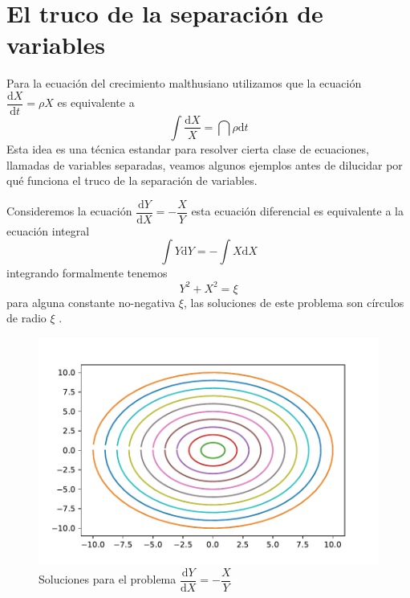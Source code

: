 \section{El truco de la separación de variables}

Para la ecuación del crecimiento malthusiano utilizamos que la ecuación $\dfrac{\mathrm{d}X}{\mathrm{d}t}=\rho X$ es equivalente a 
$$\int \dfrac{\mathrm{d}X}{X}=\dint \rho\mathrm{d}t$$
Esta idea es una técnica estandar para resolver cierta clase de ecuaciones, llamadas de variables separadas, veamos algunos ejemplos antes de dilucidar por qué funciona el truco de la separación de variables.

\begin{exampleT}
Consideremos la ecuación $\dfrac{\mathrm{d}Y}{\mathrm{d}X}=-\dfrac{X}{Y}$ esta ecuación diferencial es equivalente a la ecuación integral 
$$
\int Y\mathrm{d}Y =-\int X\mathrm{d}X
$$
integrando formalmente tenemos
$$
Y^2+X^2=\xi
$$
para alguna constante no-negativa $\xi$, las soluciones de este problema son círculos de radio $\xi$ .
\begin{figure}[H]
    \centering
    \includegraphics[scale=0.85]{circulos.pdf}
    \caption{Soluciones para el problema $\dfrac{\mathrm{d}Y}{\mathrm{d}X}=-\dfrac{X}{Y}$ }
    \label{fig:circ}
\end{figure}
\end{exampleT}

